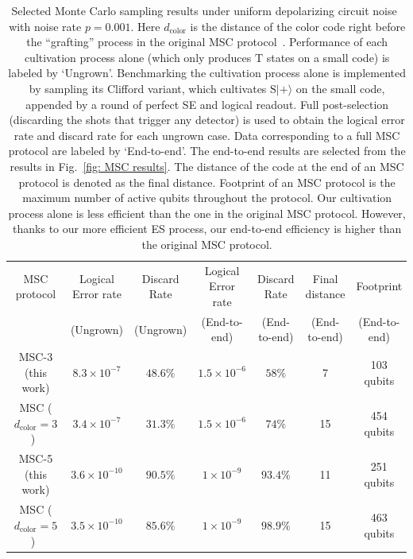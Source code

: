 \documentclass[reprint,aps,twocolumn,superscriptaddress,showpacs,notitlepage,10pt]{revtex4-2}
\theoremstyle{definition}
\begin{document}
\begin{table}
    \centering
    \begin{tabular}{||c|c|c|c|c|c|c||}
         \hline
         \hline
         MSC protocol &  Logical Error rate & Discard Rate & Logical Error rate & Discard Rate & Final distance & Footprint \\
                      &      (Ungrown)      & (Ungrown)    &    (End-to-end)    & (End-to-end) & (End-to-end) & (End-to-end) \\
         \hline
         MSC-3 (this work)& $8.3\times 10^{-7}$ & $48.6\%$ & $1.5\times 10^{-6}$ & $58\%$ & 7 & 103 qubits \\
         \hline
         MSC ($d_{\text{color}}=3$)~\cite{gidney_magic_2024} & $3.4\times 10^{-7}$ & $31.3\%$ & $1.5\times 10^{-6}$ & $74\%$ & 15 & 454 qubits \\
         \hline
         MSC-5 (this work) & $3.6\times 10^{-10}$ & $90.5\%$ & $1\times 10^{-9}$ & $93.4\%$ & 11 & 251 qubits \\
         \hline
         MSC ($d_{\text{color}}=5$)~\cite{gidney_magic_2024} & $3.5\times 10^{-10}$ & $85.6\%$ & $1\times 10^{-9}$ & $98.9\%$ & 15 & 463 qubits \\
         \hline
         \hline
    \end{tabular}
    \caption{Selected Monte Carlo sampling results under uniform depolarizing circuit noise~\cite{gidney_magic_2024} with noise rate $p=0.001$. Here $d_{\text{color}}$ is the distance of the color code right before the ``grafting'' process in the original MSC protocol~\cite{gidney_magic_2024}. Performance of each cultivation process alone (which only produces $\mathrm{T}$ states on a small code) is labeled by `Ungrown'. Benchmarking the cultivation process alone is implemented by sampling its Clifford variant, which cultivates $\mathrm{S}|+\rangle$ on the small code, appended by a round of perfect SE and logical readout. Full post-selection (discarding the shots that trigger any detector) is used to obtain the logical error rate and discard rate for each ungrown case. Data corresponding to a full MSC protocol are labeled by `End-to-end'. The end-to-end results are selected from the results in Fig.~\ref{fig: MSC results}. The distance of the code at the end of an MSC protocol is denoted as the final distance. Footprint of an MSC protocol is the maximum number of active qubits throughout the protocol. Our cultivation process alone
 is less efficient than the one in the original MSC protocol. However, thanks to our more efficient ES process, our end-to-end efficiency is higher than the original MSC protocol. }
    \label{tab: MSC results comparison}
\end{table}
\end{document}
